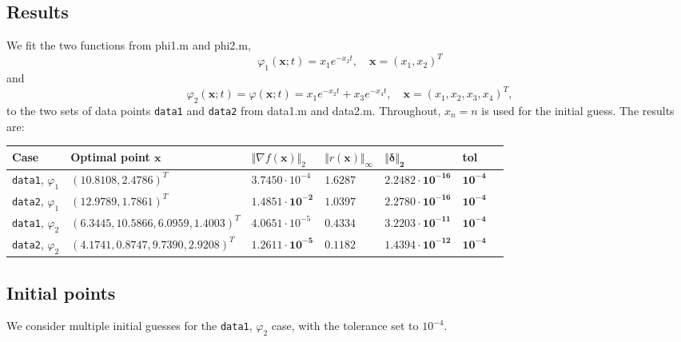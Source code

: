 \documentclass[12pt, a4paper]{article}
\newcommand{\bx}{{\boldsymbol{x}}}
\begin{document}
\subsection{Results}

We fit the two functions from phi1.m and phi2.m, \[\varphi_1(\bx;t)=x_1e^{-x_2t},\quad\bx={(x_1,x_2)}^T\] and \[\varphi_2(\bx;t)=\varphi(\bx; t)=x_1e^{-x_2t}+x_3e^{-x_4t},\quad\bx={(x_1,x_2,x_3,x_4)}^T,\] to the two sets of data points \texttt{data1} and \texttt{data2} from data1.m and data2.m. Throughout, $x_n=n$ is used for the initial guess. The results are:
\begin{center}
\hspace*{-2.8cm}%
\bgroup
\def\arraystretch{1.4}
\begin{tabular}%
  {|>{\raggedright\arraybackslash}p{1.8cm}%
    >{\raggedright\arraybackslash}p{6cm}%
    >{\centering\arraybackslash}p{2.3cm}%
    >{\centering\arraybackslash}p{1.5cm}%
    >{\centering\arraybackslash}p{3cm}%
    >{\centering\arraybackslash}p{1cm}%
    >{\centering\arraybackslash}p{0.5cm}|}
    \hline
    Case & Optimal point $\bx$ & $\Vert \nabla f(\bx) \Vert_2$ & $\Vert r(\bx) \Vert_{\infty}$ &  $\mathbf{\Vert \delta \Vert_2}$ & \textbf{tol}&\\ 
    
    \hline
    \texttt{data1}, $\varphi_1$ & ${(10.8108, 2.4786)}^T$ & $3.7450\cdot10^{-4}$ & $1.6287$
    & $\mathbf{2.2482\cdot10^{-16}}$ & $\mathbf{10^{-4}}$ &\\
    \texttt{data2}, $\varphi_1$ & ${(12.9789, 1.7861)}^T$ & $\mathbf{1.4851\cdot10^{-2}}$ & $1.0397$
    &$\mathbf{2.2780\cdot10^{-16}}$ & $\mathbf{10^{-4}}$ &\\
    \texttt{data1}, $\varphi_2$ & ${(6.3445, 10.5866, 6.0959, 1.4003)}^T$ & $4.0651\cdot10^{-5}$ & $0.4334$
    & $\mathbf{3.2203\cdot10^{-11}}$ & $\mathbf{10^{-4}}$&\\
    \texttt{data2}, $\varphi_2$ & ${(4.1741, 0.8747, 9.7390, 2.9208)}^T$ & $\mathbf{1.2611\cdot10^{-5}}$ & $0.1182$
    &$\mathbf{1.4394\cdot10^{-12}}$ & $\mathbf{10^{-4}}$ & \\ \hline
\end{tabular}
\egroup\end{center}

\subsection{Initial points}

We consider multiple initial guesses for the \texttt{data1}, $\varphi_2$ case, with the tolerance set to $10^{-4}$.
\end{document}

